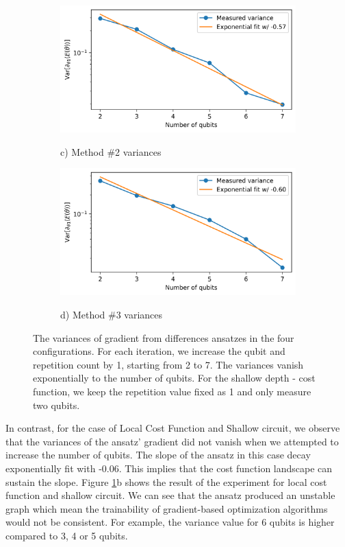 \begin{figure}
    \begin{subfigure}[b]{.49\textwidth}
        \includegraphics[width=\textwidth]{Artefact/Appendices/var2.png}
        \centerline{c) Method \#2 variances}
    \end{subfigure}
    \hfill
    \begin{subfigure}[b]{.49\textwidth}
        \includegraphics[width=\textwidth]{Artefact/Appendices/var3.png}
        \centerline{d) Method \#3 variances}
    \end{subfigure}

    \caption{
        The variances of gradient from differences ansatzes in the four configurations.
        For each iteration, we increase the qubit and repetition count by 1, starting from 2 to 7.
        The variances vanish exponentially to the number of qubits.
        For the shallow depth - cost function, we keep the repetition value fixed as 1 and only measure two qubits.
    }
    \label{Plot ansatzes variance}
\end{figure}

In contrast, for the case of Local Cost Function and Shallow circuit, we observe that the variances of the ansatz' gradient did not vanish when we attempted to increase the number of qubits.
The slope of the ansatz in this case decay exponentially fit with -0.06.
This implies that the cost function landscape can sustain the slope.
Figure \ref{Plot ansatzes variance}b shows the result of the experiment for local cost function and shallow circuit.
We can see that the ansatz produced an unstable graph which mean the trainability of gradient-based optimization algorithms would not be consistent.
For example, the variance value for 6 qubits is higher compared to 3, 4 or 5 qubits.

